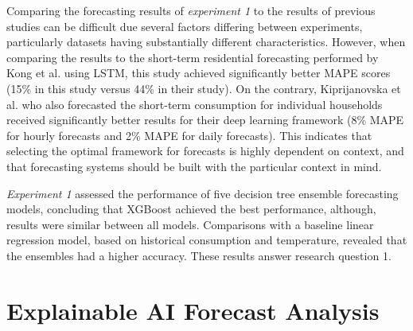 
Comparing the forecasting results of \emph{experiment 1} to the results of previous studies can be difficult due several factors differing between experiments, particularly datasets having substantially different characteristics. However, when comparing the results to the short-term residential forecasting performed by Kong et al. \cite{kong_short-term_2019} using LSTM, this study achieved significantly better MAPE scores (15\% in this study versus 44\% in their study). On the contrary, Kiprijanovska et al. \cite{kiprijanovska_houseec_2020} who also forecasted the short-term consumption for individual households received significantly better results for their deep learning framework (8\% MAPE for hourly forecasts and 2\% MAPE for daily forecasts). This indicates that selecting the optimal framework for forecasts is highly dependent on context, and that forecasting systems should be built with the particular context in mind.

\emph{Experiment 1} assessed the performance of five decision tree ensemble forecasting models, concluding that XGBoost achieved the best performance, although, results were similar between all models. Comparisons with a baseline linear regression model, based on historical consumption and temperature, revealed that the ensembles had a higher accuracy. These results answer research question 1.

\section{Explainable AI Forecast Analysis}

